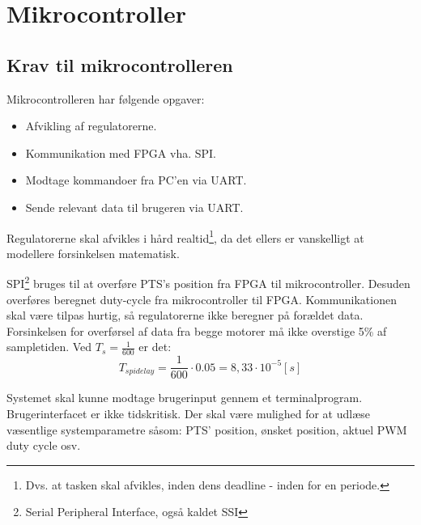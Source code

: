 \section{Mikrocontroller}
\label{sec:mikrocontroller}
%
\subsection{Krav til mikrocontrolleren}
Mikrocontrolleren har følgende opgaver: 


\begin{itemize}
\itemsep1pt
	\item Afvikling af regulatorerne.
	\item Kommunikation med FPGA vha. SPI.
	\item Modtage kommandoer fra PC'en via UART.
	\item Sende relevant data til brugeren via UART.
\end{itemize}

Regulatorerne skal afvikles i hård realtid\footnote{Dvs. at tasken skal afvikles, inden dens deadline - inden for en periode.}, da det ellers er vanskelligt at modellere forsinkelsen matematisk.


SPI\footnote{Serial Peripheral Interface, også kaldet SSI} bruges til at overføre PTS's position fra FPGA til mikrocontroller. Desuden overføres beregnet duty-cycle fra mikrocontroller til FPGA. Kommunikationen skal være tilpas hurtig, så regulatorerne ikke beregner på forældet data. Forsinkelsen for overførsel af data fra begge motorer må ikke overstige 5\% af sampletiden. Ved $T_s = \frac{1}{600}$ er det: 
\begin{equation}
	T_{spi delay} = \frac{1}{600} \cdot 0.05 = 8,33 \cdot 10^{-5}[s]
	\label{eq:uc:spi-krav}
\end{equation}


Systemet skal kunne modtage brugerinput gennem et terminalprogram. Brugerinterfacet er ikke tidskritisk. Der skal være mulighed for at udlæse væsentlige systemparametre såsom: PTS' position, ønsket position, aktuel PWM duty cycle osv.



